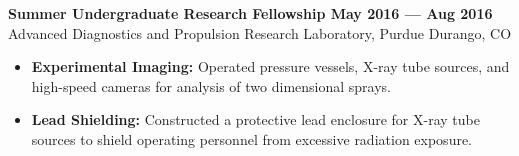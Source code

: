\noindent \textbf{Summer Undergraduate Research Fellowship \hfill May 2016 --- Aug 2016}\\
Advanced Diagnostics and Propulsion Research Laboratory, Purdue \dotfill Durango, CO

\begin{itemize}
    \item \textbf{Experimental Imaging:} Operated pressure vessels, X-ray tube sources, and high-speed cameras for analysis of two dimensional sprays.
    \item \textbf{Lead Shielding:} Constructed a protective lead enclosure for X-ray tube sources to shield operating personnel from excessive radiation exposure.
\end{itemize}
